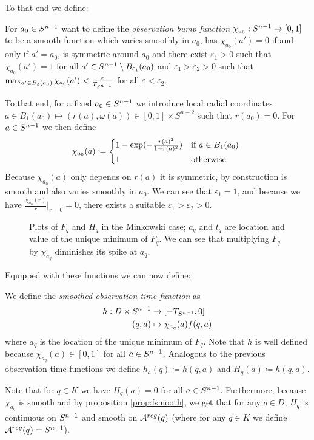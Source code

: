 To that end we define:
\begin{definition}\label{def:obsbumpfn}
    For $a_0\in {S^{n-1}}$ want to define the \emph{observation bump function} $\chi_{a_0}:{S^{n-1}}\to [0,1]$ to be a smooth function which varies smoothly in $a_0$, has $\chi_{a_0}(a')=0$ if and only if $a'=a_0$, is symmetric around $a_0$ and there exist $\varepsilon_1>0$ such that $\chi_{a_0}(a')=1$ for all $a'\in {S^{n-1}}\setminus B_{\varepsilon_1}(a_0)$ and $\varepsilon_1 > \varepsilon_2 > 0$ such that $\max_{a'\in B_{\varepsilon}(a_0)} \chi_{a_0}(a')<\frac{\varepsilon}{T_{S^{n-1}}}$ for all $\varepsilon<\varepsilon_2$.

    To that end, for a fixed $a_0\in {S^{n-1}}$ we introduce local radial coordinates $a\in B_1(a_0)\mapsto (r(a),\omega(a))\in [0,1]\times S^{n-2}$ such that $r(a_0)=0$. For $a \in {S^{n-1}}$ we then define 
    \begin{equation*}
        \chi_{a_0}(a) \coloneqq  
        \begin{cases*}
            1-\exp(-\frac{r(a)^2}{1-r(a)^2}) & if $a\in B_1(a_0)$ \\
            1 & otherwise
        \end{cases*}
    \end{equation*}
    Because $\chi_{a_0}(a)$ only depends on $r(a)$ it is symmetric, by construction is smooth and also varies smoothly in $a_0$. We can see that $\varepsilon_1 = 1$, and because we have $\frac{\chi_{a_0}(r)}{r}\rvert_{r=0}=0$, there exists a suitable $\varepsilon_1 > \varepsilon_2 > 0$.
\end{definition}

\begin{figure}\label{fig:SmoothedObsTime}
    \centering
    
    \caption{
        Plots of $F_q$ and $H_q$ in the Minkowski case; $a_q$ and $t_q$ are location and value of the unique minimum of $F_q$. We can see that multiplying $F_q$ by $\chi_{a_q}$ diminishes its spike at $a_q$.
    }
\end{figure}

Equipped with these functions we can now define:
\begin{definition}
    We define the \emph{smoothed observation time function} as 
    \begin{align*}
        h:D\times {S^{n-1}} &\to [-T_{S^{n-1}},0] \\
        (q,a)&\mapsto \chi_{a_q}(a)f(q,a)
    \end{align*}
    where $a_q$ is the location of the unique minimum of $F_q$. Note that $h$ is well defined because $\chi_{a_q}(a)\in [0,1]$ for all $a\in {S^{n-1}}$. 
    Analogous to the previous observation time functions we define $h_a(q)\coloneqq h(q,a)$ and $H_q(a)\coloneqq h(q,a)$.
\end{definition}
\begin{remark}
    Note that for $q\in K$ we have $H_q(a)=0$ for all $a\in {S^{n-1}}$. Furthermore, because $\chi_{a_q}$ is smooth and by proposition \ref{prop:fsmooth}, we get that for any $q\in D$, $H_q$ is continuous on ${S^{n-1}}$ and smooth on ${{\mathcal{A}}^{reg}}(q)$ (where for any $q\in K$ we define ${{\mathcal{A}}^{reg}}(q)={S^{n-1}}$).
\end{remark}

